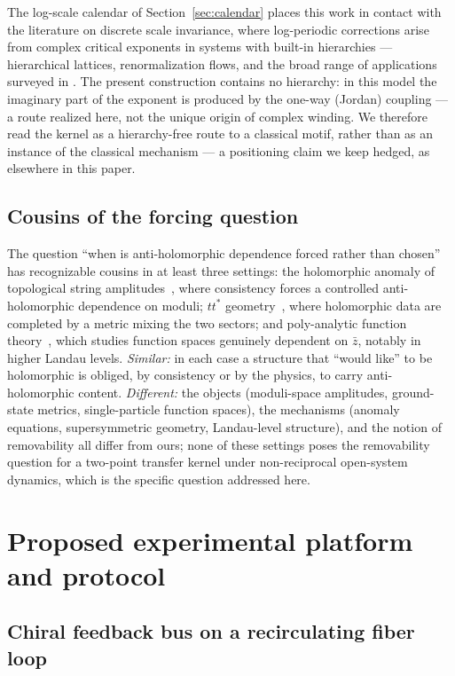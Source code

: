 \documentclass[11pt,a4paper]{article}
\newcommand{\zb}{\bar{z}}
\begin{document}
The log-scale calendar of Section~\ref{sec:calendar} places this work in
contact with the literature on discrete scale invariance, where
log-periodic corrections arise from complex critical exponents
\cite{Derrida1984,Sornette1998} in systems with built-in hierarchies ---
hierarchical lattices, renormalization flows, and the broad range of
applications surveyed in \cite{Sornette1998}. The present construction
contains no hierarchy: in this model the imaginary part of the exponent is
produced by the one-way (Jordan) coupling --- a route realized here, not the
unique origin of complex winding. We therefore read the kernel as a
hierarchy-free route to a classical motif, rather than as an instance of
the classical mechanism --- a positioning claim we keep hedged, as
elsewhere in this paper.

\subsection{Cousins of the forcing question}

The question ``when is anti-holomorphic dependence forced rather than chosen''
has recognizable cousins in at least three settings: the holomorphic anomaly of
topological string amplitudes~\cite{BCOV1994}, where consistency forces a
controlled anti-holomorphic dependence on moduli; $tt^*$
geometry~\cite{CecottiVafa1991}, where holomorphic data are completed by a
metric mixing the two sectors; and poly-analytic function
theory~\cite{Vasilevski2000,Abreu2010,AbreuFeichtinger2014}, which studies
function spaces genuinely dependent on $\zb$, notably in higher Landau levels.
\emph{Similar:} in each case a structure that ``would like'' to be holomorphic
is obliged, by consistency or by the physics, to carry anti-holomorphic
content. \emph{Different:} the objects (moduli-space amplitudes, ground-state
metrics, single-particle function spaces), the mechanisms (anomaly equations,
supersymmetric geometry, Landau-level structure), and the notion of
removability all differ from ours; none of these settings poses the
removability question for a two-point transfer kernel under non-reciprocal
open-system dynamics, which is the specific question addressed here.

\section{Proposed experimental platform and protocol}
\label{sec:platform}

\subsection{Chiral feedback bus on a recirculating fiber loop}
\end{document}
